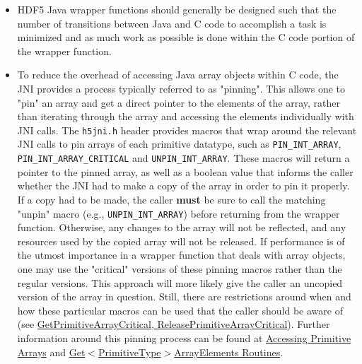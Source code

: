 \begin{itemize}
  \item HDF5 Java wrapper functions should generally be designed such that the number of transitions
  between Java and C code to accomplish a task is minimized and as much work as possible is
  done within the C code portion of the wrapper function.
  \item To reduce the overhead of accessing Java array objects within C code, the JNI provides a
  process typically referred to as "pinning". This allows one to "pin" an array and get a direct
  pointer to the elements of the array, rather than iterating through the array and accessing the
  elements individually with JNI calls. The \texttt{h5jni.h} header provides macros that wrap around
  the relevant JNI calls to pin arrays of each primitive datatype, such as \texttt{PIN\_INT\_ARRAY},
  \texttt{PIN\_INT\_ARRAY\_CRITICAL} and \texttt{UNPIN\_INT\_ARRAY}. These macros will return a pointer
  to the pinned array, as well as a boolean value that informs the caller whether the JNI had to make
  a copy of the array in order to pin it properly. If a copy had to be made, the caller \textbf{must}
  be sure to call the matching "unpin" macro (e.g., \texttt{UNPIN\_INT\_ARRAY}) before returning from
  the wrapper function. Otherwise, any changes to the array will not be reflected, and any resources
  used by the copied array will not be released. If performance is of the utmost importance in a wrapper
  function that deals with array objects, one may use the "critical" versions of these pinning macros
  rather than the regular versions. This approach will more likely give the caller an uncopied
  version of the array in question. Still, there are restrictions around when and how these particular
  macros can be used that the caller should be aware of (see \href{https://docs.oracle.com/en/java/javase/17/docs/specs/jni/functions.html#getprimitivearraycritical-releaseprimitivearraycritical}{GetPrimitiveArrayCritical, ReleasePrimitiveArrayCritical}).
  Further information around this pinning process can be found at \href{https://docs.oracle.com/en/java/javase/17/docs/specs/jni/design.html#accessing-primitive-arrays}{Accessing Primitive Arrays}
  and \href{https://docs.oracle.com/en/java/javase/17/docs/specs/jni/functions.html#getprimitivetypearrayelements-routines}{Get$<$PrimitiveType$>$ArrayElements Routines}.
\end{itemize}
